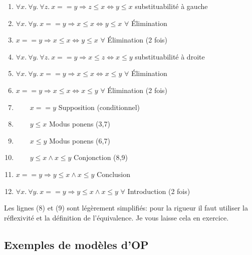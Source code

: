 {\begin{enumerate}
\item $ \forall x.\ \forall y.\ \forall z.\ x==y \Rightarrow z \leq x \Leftrightarrow y \leq x$ \hfill substituabilité à gauche
\item $ \forall x.\ \forall y.\ x==y \Rightarrow x \leq x \Leftrightarrow y \leq x$ \hfill $\forall$ Élimination
\item $ x==y \Rightarrow x \leq x \Leftrightarrow y \leq x $ \hfill $\forall$ Élimination (2 fois)
\item $ \forall x.\ \forall y.\ \forall z.\ x==y \Rightarrow x \leq z \Leftrightarrow x \leq y$ \hfill substituabilité à droite
\item $ \forall x.\ \forall y.\ x==y \Rightarrow x \leq x \Leftrightarrow x \leq y$ \hfill $\forall$ Élimination
\item $ x==y \Rightarrow x \leq x \Leftrightarrow x \leq y $ \hfill $\forall$ Élimination (2 fois)
\item $ \quad \quad x==y$ \hfill Supposition (conditionnel)
\item $ \quad \quad y\leq x$ \hfill Modus ponens (3,7)
\item $ \quad \quad x\leq y$ \hfill Modus ponens (6,7)
\item $ \quad \quad y\leq x \land  x\leq y$ \hfill Conjonction (8,9)
\item $ x==y \Rightarrow y\leq x \land  x\leq y$ \hfill Conclusion
\item $ \forall x.\ \forall y.\ x==y \Rightarrow y\leq x \land  x\leq y$ \hfill $\forall$ Introduction (2 fois)
\end{enumerate}
Les lignes (8) et (9) sont légèrement simplifiés: pour la rigueur il faut utiliser la réflexivité
et la définition de l'équivalence.
Je vous laisse cela en exercice.

\subsection{Exemples de modèles d'OP}

}
